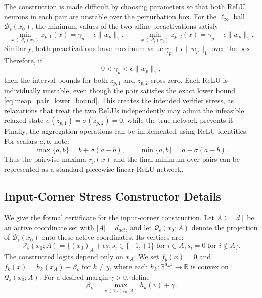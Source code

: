 \documentclass{article}
\theoremstyle{definition}
\begin{document}
The construction is made difficult by choosing parameters so that both ReLU neurons in each pair are unstable over the perturbation box. For the $\ell_\infty$ ball $\mathcal B_\epsilon(x_0)$, the minimum values of the two affine preactivations satisfy
\begin{equation}
    \min_{x\in\mathcal B_\epsilon(x_0)} z_{p,1}(x)=\gamma_p-\epsilon\|w_p\|_1,
    \qquad
    \min_{x\in\mathcal B_\epsilon(x_0)} z_{p,2}(x)= \gamma_p-\epsilon\|w_p\|_1.
    \label{eq:meap_min_values}
\end{equation}
Similarly, both preactivations have maximum value $\gamma_p+\epsilon\|w_p\|_1$ over the box. Therefore, if
\begin{equation}
    0<\gamma_p<\epsilon\|w_p\|_1,
    \label{eq:meap_instability_condition}
\end{equation}
then the interval bounds for both $z_{p,1}$ and $z_{p,2}$ cross zero. Each ReLU is individually unstable, even though the pair satisfies the exact lower bound \eqref{eq:meap_pair_lower_bound}. This creates the intended verifier stress, as relaxations that treat the two ReLUs independently may admit the infeasible relaxed state $\sigma(z_{p,1})=\sigma(z_{p,2})=0$, while the true network prevents it. Finally, the aggregation operations can be implemented using ReLU identities. For scalars $a,b$, note:
\begin{equation}
    \max\{a,b\}=b+\sigma(a-b), \qquad
    \min\{a,b\}=a-\sigma(a-b).
    \label{eq:relu_minmax_identities}
\end{equation}
Thus the pairwise maxima $r_p(x)$ and the final minimum over pairs can be represented as a standard piecewise-linear ReLU network.

\subsection{Input-Corner Stress Constructor Details}
\label{app:corner}

We give the formal certificate for the input-corner construction. Let $A\subseteq[d]$ be an active coordinate set with $|A|=d_{act}$, and let $\mathcal Q_\epsilon(x_0;A)$ denote the projection of $\mathcal B_\epsilon(x_0)$ onto these active coordinates. Its vertices are:
\begin{equation}
    \mathcal V_\epsilon(x_0;A)=\{(x_0)_A+\epsilon s:s_i\in\{-1,+1\} \text{ for } i\in A, s_i=0 \text{ for } i \notin A\}.
    \label{eq:corner_vertices}
\end{equation}
The constructed logits depend only on $x_A$. We set $f_y(x)=0$ and $f_k(x)=h_k(x_A)-\beta_k$ for $k\neq y$, where each $h_k:\mathbb R^{d_{act}}\to\mathbb R$ is convex on $\mathcal Q_\epsilon(x_0;A)$. For a desired margin $\gamma>0$, define
\begin{equation}
    \beta_k=\max_{v\in\mathcal V_\epsilon(x_0;A)}h_k(v)+\gamma.
    \label{eq:app_corner_beta}
\end{equation}
\end{document}
